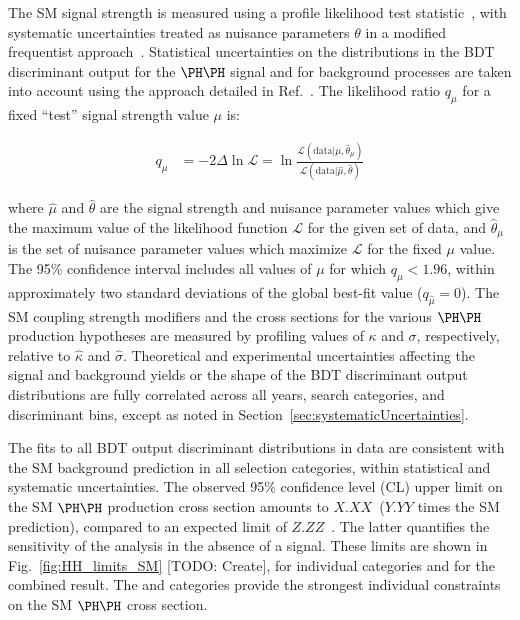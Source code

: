 The SM signal strength is measured using a profile likelihood test
statistic~\cite{Cowan:2010js}, with systematic uncertainties treated as nuisance
parameters $\theta$ in a modified frequentist approach~\cite{ATL-PHYS-PUB-2011-011}.
Statistical uncertainties on the distributions in the BDT discriminant output for the $\HH$ signal and for background processes
are taken into account using the approach detailed in Ref.~\cite{Barlow:1993dm}.
The likelihood ratio $q_{\mu}$ for a fixed ``test'' signal strength value $\mu$ is:
\begin{linenomath}
\begin{equation*}
  \begin{aligned}
    q_{\mu}  &  = -2 \Delta \ln \mathcal{L} = \ln \frac{\mathcal{L}(\mathrm{data}|\mu,\hat{\theta}_{\mu})}{\mathcal{L}(\mathrm{data}|\hat{\mu},\hat{\theta})}
  \end{aligned}
\end{equation*}
\end{linenomath}
where $\hat{\mu}$ and $\hat{\theta}$ are the signal strength and nuisance
parameter values which give the maximum value of the likelihood function $\mathcal{L}$
for the given set of data, and $\hat{\theta}_{\mu}$ is the set of nuisance
parameter values which maximize $\mathcal{L}$ for the fixed $\mu$ value.
The 95\% confidence interval includes all values of $\mu$ for which $q_{\mu} < 1.96$,
within approximately two standard deviations of the global best-fit value ($q_{\hat{\mu}} = 0$).
The SM coupling strength modifiers and the cross sections for the various $\HH$ production hypotheses
are measured by profiling values of $\kappa$ and $\sigma$, respectively,
relative to $\hat{\kappa}$ and $\hat{\sigma}$.
Theoretical and experimental uncertainties affecting the signal and
background yields or the shape of the BDT discriminant output distributions are fully
correlated across all years, search categories, and discriminant bins,
except as noted in Section~\ref{sec:systematicUncertainties}.

The fits to all BDT output discriminant distributions in data are consistent with the
SM background prediction in all selection categories, within statistical and systematic uncertainties.
The observed 95\% confidence level (CL) upper limit on the SM $\HH$ production cross section
amounts to $X.XX$~\pb ($Y.YY$ times the SM prediction), compared to an
expected limit of $Z.ZZ$~\pb.
The latter quantifies the sensitivity of the analysis in the absence of a signal.
These limits are shown in Fig.~\ref{fig:HH_limits_SM} [TODO: Create],
for individual categories and for the combined result.
The \lttt and \lllnot categories provide the strongest individual
constraints on the SM $\HH$ cross section.


